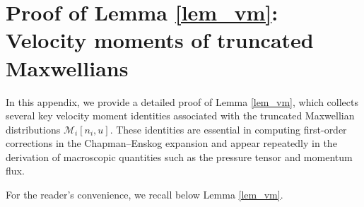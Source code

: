 \documentclass[10pt,reqno]{amsart}
\numberwithin{equation}{section}
\begin{document}
%
%
%                         
%
%
 

 

%
%
%
%
%
%
%
%
%
%
%
%
%


\section{Proof of Lemma \ref{lem_vm}: Velocity moments of truncated Maxwellians}\label{app_vm}


In this appendix, we provide a detailed proof of Lemma \ref{lem_vm}, which collects several key velocity moment identities associated with the truncated Maxwellian distributions $\mathcal{M}_i[n_i, u]$. These identities are essential in computing first-order corrections in the Chapman--Enskog expansion and appear repeatedly in the derivation of macroscopic quantities such as the pressure tensor and momentum flux.

For the reader's convenience, we recall below Lemma \ref{lem_vm}.
\end{document}
